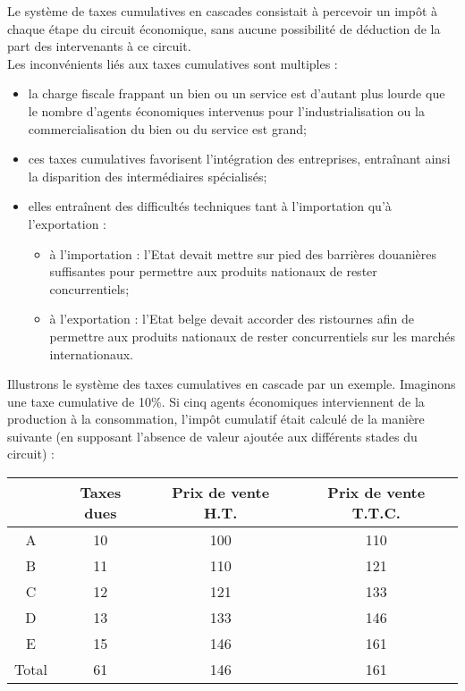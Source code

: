 \documentclass{book}
\begin{document}
Le système de taxes cumulatives en cascades consistait à percevoir un impôt à chaque étape
du circuit économique, sans aucune possibilité de déduction de la part des intervenants à ce
circuit.\\

Les inconvénients liés aux taxes cumulatives sont multiples :\\

\begin{itemize}

\item la charge fiscale frappant un bien ou un service est d'autant plus lourde que le
nombre d'agents économiques intervenus pour l'industrialisation ou la
commercialisation du bien ou du service est grand;
\item ces taxes cumulatives favorisent l'intégration des entreprises, entraînant ainsi la
disparition des intermédiaires spécialisés;
\item elles entraînent des difficultés techniques tant à l'importation qu'à l'exportation :
\begin{itemize}
\item à l'importation : l'Etat devait mettre sur pied des barrières douanières
suffisantes pour permettre aux produits nationaux de rester concurrentiels;
\item à l'exportation : l'Etat belge devait accorder des ristournes afin de permettre
aux produits nationaux de rester concurrentiels sur les marchés internationaux.
\end{itemize}
\end{itemize}
\null 
 
Illustrons le système des taxes cumulatives en cascade par un exemple. Imaginons une taxe
cumulative de 10\%. Si cinq agents économiques interviennent de la production à la
consommation, l'impôt cumulatif était calculé de la manière suivante (en supposant l'absence
de valeur ajoutée aux différents stades du circuit) :\\



\begin{tabular}{|c|c|c|c|}
  \hline
  & Taxes dues & Prix de vente H.T. & Prix de vente T.T.C. \\
  \hline
  A & 10 & 100 & 110\\
    \hline
B & 11 & 110 & 121\\
  \hline
C & 12 & 121 & 133\\
  \hline
D & 13 & 133 & 146\\
  \hline
E & 15 & 146 & 161\\
  \hline
Total & 61 & 146 & 161\\

  \hline
\end{tabular}
\end{document}
